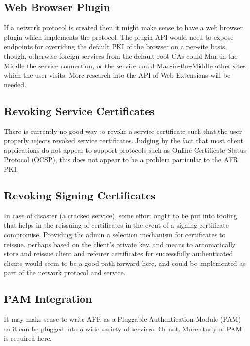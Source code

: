 \documentclass{article}
\begin{document}
\subsection{Web Browser Plugin}

If a network protocol is created then it might make sense to have a web browser plugin which implements the protocol.  The plugin API would need to expose endpoints for overriding the default PKI of the browser on a per-site basis, though, otherwise foreign services from the default root CAs could Man-in-the-Middle the service connection, or the service could Man-in-the-Middle other sites which the user visits.  More research into the API of Web Extensions will be needed.

\subsection{Revoking Service Certificates}
\label{future-revoke-service}
There is currently no good way to revoke a service certificate such that the user properly rejects revoked service certificates.  Judging by the fact that most client applications do not appear to support protocols such as Online Certificate Status Protocol (OCSP), this does not appear to be a problem particular to the AFR PKI.

\subsection{Revoking Signing Certificates}

In case of disaster (a cracked service), some effort ought to be put into tooling that helps in the reissuing of certificates in the event of a signing certificate compromise.  Providing the admin a selection mechanism for certificates to reissue, perhaps based on the client's private key, and means to automatically store and reissue client and referrer certificates for successfully authenticated clients would seem to be a good path forward here, and could be implemented as part of the network protocol and service.

\subsection{PAM Integration}

It may make sense to write AFR as a Pluggable Authentication Module (PAM) so it can be plugged into a wide variety of services.  Or not.  More study of PAM is required here.
\end{document}
